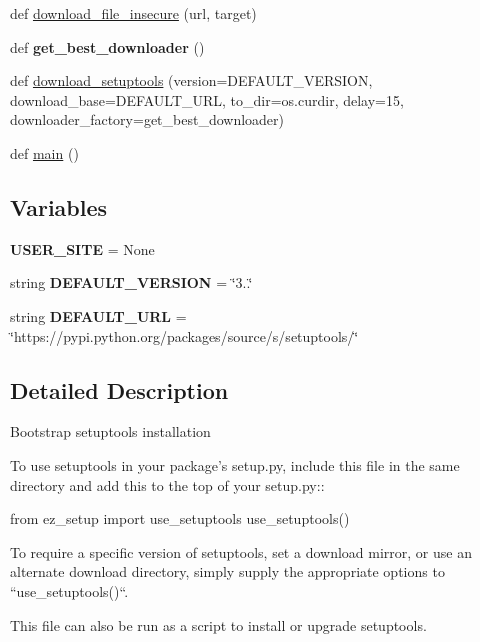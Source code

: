 \begin{DoxyCompactItemize}
\item 
def \hyperlink{namespaceez__setup_a77f73fd049bccd9c8b10f5be6ef16ed1}{download\+\_\+file\+\_\+insecure} (url, target)
\item 
\mbox{\label{namespaceez__setup_a37c9e523f99cd7b5cfd01eada43de9ad}} 
def {\bfseries get\+\_\+best\+\_\+downloader} ()
\item 
def \hyperlink{namespaceez__setup_ad41db6464296e12f487740425f92091d}{download\+\_\+setuptools} (version=D\+E\+F\+A\+U\+L\+T\+\_\+\+V\+E\+R\+S\+I\+ON, download\+\_\+base=D\+E\+F\+A\+U\+L\+T\+\_\+\+U\+RL, to\+\_\+dir=os.\+curdir, delay=15, downloader\+\_\+factory=get\+\_\+best\+\_\+downloader)
\item 
def \hyperlink{namespaceez__setup_abc81dbe1d4caae0b1729c17a6914882e}{main} ()
\end{DoxyCompactItemize}
\subsection*{Variables}
\begin{DoxyCompactItemize}
\item 
\mbox{\label{namespaceez__setup_a7d83143a1fe0b349410ca451d3306eb8}} 
{\bfseries U\+S\+E\+R\+\_\+\+S\+I\+TE} = None
\item 
\mbox{\label{namespaceez__setup_aa031ee965f5310beedcd57236385d518}} 
string {\bfseries D\+E\+F\+A\+U\+L\+T\+\_\+\+V\+E\+R\+S\+I\+ON} = \char`\"{}3..\char`\"{}
\item 
\mbox{\label{namespaceez__setup_a8096341ad5ff1c048779efc8668fe864}} 
string {\bfseries D\+E\+F\+A\+U\+L\+T\+\_\+\+U\+RL} = \char`\"{}https\+://pypi.\+python.\+org/packages/source/s/setuptools/\char`\"{}
\end{DoxyCompactItemize}


\subsection{Detailed Description}
\begin{DoxyVerb}Bootstrap setuptools installation

To use setuptools in your package's setup.py, include this
file in the same directory and add this to the top of your setup.py::

from ez_setup import use_setuptools
use_setuptools()

To require a specific version of setuptools, set a download
mirror, or use an alternate download directory, simply supply
the appropriate options to ``use_setuptools()``.

This file can also be run as a script to install or upgrade setuptools.
\end{DoxyVerb}
 

